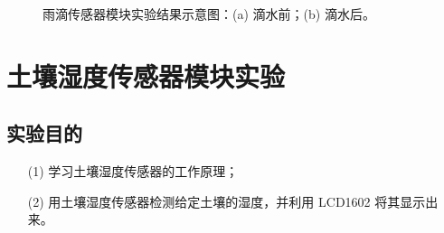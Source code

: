 \documentclass[UTF8, oneside]{ctexbook}
\begin{document}
\begin{figure}[h]
    \centering


    \centering
    \caption{雨滴传感器模块实验结果示意图：(a) 滴水前；(b) 滴水后。}
    \label{s16_1}
    
\end{figure}

\chapter{土壤湿度传感器模块实验}

\section{实验目的}
\begin{itemize}
    \item[(1)] 学习土壤湿度传感器的工作原理；
    \item[(2)] 用土壤湿度传感器检测给定土壤的湿度，并利用 LCD1602 将其显示出来。
\end{itemize}
\end{document}
